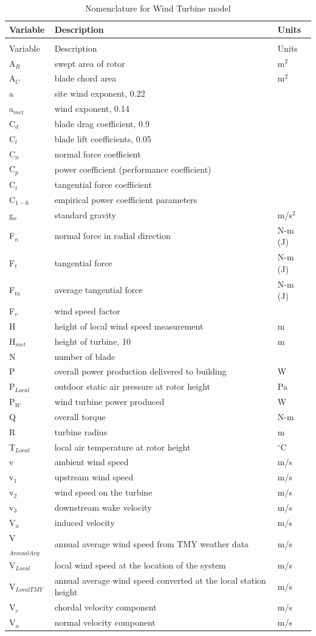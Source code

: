 \begin{longtable}[c]{p{1.2in}p{3.3in}p{1.5in}}
\caption{Nomenclature for Wind Turbine model \label{table:nomenclature-for-wind-turbine-model}} \tabularnewline
\toprule
Variable & Description & Units \tabularnewline
\midrule
\endfirsthead

\caption[]{Nomenclature for Wind Turbine model} \tabularnewline
\toprule
Variable & Description & Units \tabularnewline
\midrule
\endhead

A\(_{R}\) & swept area of rotor & m\(^{2}\) \tabularnewline
A\(_{C}\) & blade chord area & m\(^{2}\) \tabularnewline
a & site wind exponent, 0.22 & ~ \tabularnewline
a\(_{met}\) & wind exponent, 0.14 & ~ \tabularnewline
C\(_{d}\) & blade drag coefficient, 0.9 & ~ \tabularnewline
C\(_{l}\) & blade lift coefficients, 0.05 & ~ \tabularnewline
C\(_{n}\) & normal force coefficient & ~ \tabularnewline
C\(_{p}\) & power coefficient (performance coefficient) & ~ \tabularnewline
C\(_{t}\) & tangential force coefficient & ~ \tabularnewline
C\(_{1-6}\) & empirical power coefficient parameters & ~ \tabularnewline
g\(_{o}\) & standard gravity & m/s\(^{2}\) \tabularnewline
F\(_{n}\) & normal force in radial direction & N-m (J) \tabularnewline
F\(_{t}\) & tangential force & N-m (J) \tabularnewline
F\(_{ta}\) & average tangential force & N-m (J) \tabularnewline
F\(_{v}\) & wind speed factor & ~ \tabularnewline
H & height of local wind speed measurement & m \tabularnewline
H\(_{met}\) & height of turbine, 10 & m \tabularnewline
N & number of blade & ~ \tabularnewline
P & overall power production delivered to building~ & W \tabularnewline
P\(_{Local}\) & outdoor static air pressure at rotor height & Pa \tabularnewline
P\(_{W}\) & wind turbine power produced & W \tabularnewline
Q & overall torque & N-m \tabularnewline
R & turbine radius & m \tabularnewline
T\(_{Local}\) & local air temperature at rotor height & \(^{\circ}\)C \tabularnewline
v & ambient wind speed & m/s \tabularnewline
v\(_{1}\) & upstream wind speed & m/s \tabularnewline
v\(_{2}\) & wind speed on the turbine & m/s \tabularnewline
v\(_{3}\) & downstream wake velocity & m/s \tabularnewline
V\(_{a}\) & induced velocity & m/s \tabularnewline
V\(_{AnnualAvg}\) & annual average wind speed from TMY weather data & m/s \tabularnewline
V\(_{Local}\) & local wind speed at the location of the system & m/s \tabularnewline
V\(_{LocalTMY}\) & annual average wind speed converted at the local station height & m/s \tabularnewline
V\(_{c}\) & chordal velocity component & m/s \tabularnewline
V\(_{n}\) & normal velocity component & m/s \tabularnewline

\end{longtable}
